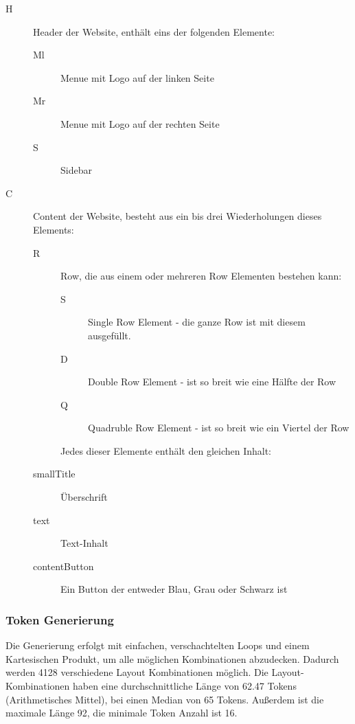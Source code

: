 \documentclass[pdftex,a4paper,halfparskip, article]{scrartcl}
\begin{document}
\begin{description}
	\item[H] Header der Website, enthält eins der folgenden Elemente: 
	\begin{description}
		\item[Ml] Menue mit Logo auf der linken Seite
		\item[Mr] Menue mit Logo auf der rechten Seite
		\item[S] Sidebar	
	\end{description}
	\item[C] Content der Website, besteht aus ein bis drei Wiederholungen dieses Elements:
	\begin{description}
		\item[R] Row, die aus einem oder mehreren Row Elementen bestehen kann:
		\begin{description}
			\item[S] Single Row Element - die ganze Row ist mit diesem ausgefüllt.
			\item[D] Double Row Element - ist so breit wie eine Hälfte der Row
			\item[Q] Quadruble Row Element - ist so breit wie ein Viertel der Row
		\end{description}
		Jedes dieser Elemente enthält den gleichen Inhalt:
		\item[smallTitle] Überschrift
		\item[text] Text-Inhalt
		\item[contentButton] Ein Button der entweder Blau, Grau oder Schwarz ist 
	\end{description}
\end{description}

\subsubsection{Token Generierung}

Die Generierung erfolgt mit einfachen, verschachtelten Loops und einem Kartesischen Produkt, um alle möglichen Kombinationen abzudecken. Dadurch werden 4128 verschiedene Layout Kombinationen möglich. 
Die Layout-Kombinationen haben eine durchschnittliche Länge von 62.47 Tokens (Arithmetisches Mittel), bei einen Median von 65 Tokens. Außerdem ist die maximale Länge 92, die minimale Token Anzahl ist 16.
\end{document}
